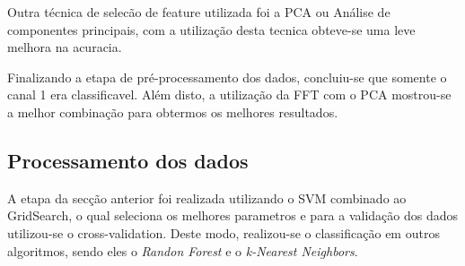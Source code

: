 Outra técnica de selecão de feature utilizada foi a PCA ou Análise de componentes principais, com a utilização desta tecnica obteve-se uma leve melhora na acuracia.

Finalizando a etapa de pré-processamento dos dados, concluiu-se que somente o canal 1 era classificavel. Além disto, a utilização da FFT com o PCA mostrou-se a melhor combinação para obtermos os melhores resultados.

\subsection{Processamento dos dados}
A etapa da secção anterior foi realizada utilizando o SVM combinado ao GridSearch, o qual seleciona os melhores parametros e para a validação dos dados utilizou-se o cross-validation. Deste modo, realizou-se o classificação em outros algoritmos, sendo eles o \textit{Randon Forest} e o \textit{k-Nearest Neighbors}.

